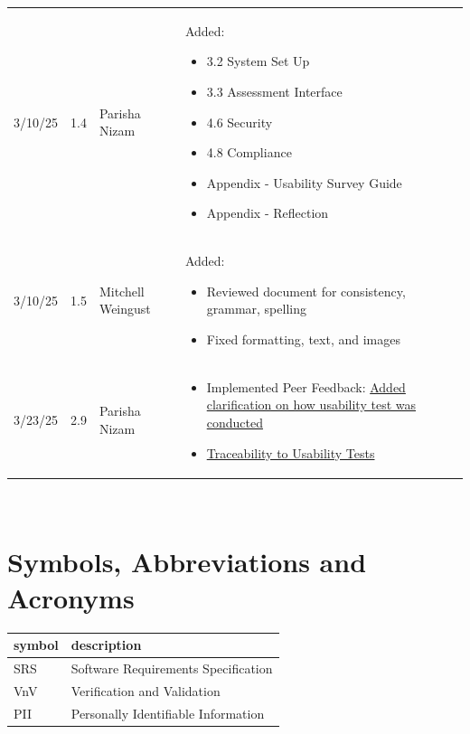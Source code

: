 \documentclass[12pt, titlepage]{article}
\begin{document}
\begin{table}[hp]
\begin{tabularx}{\textwidth}{p{1.5cm}p{1cm}p{3.5cm}X}
  3/10/25 & 1.4 & Parisha Nizam & Added:\begin{itemize}[leftmargin=*]
    \item 3.2 System Set Up
    \item 3.3 Assessment Interface
    \item 4.6 Security
    \item 4.8 Compliance 
    \item Appendix - Usability Survey Guide
    \item Appendix - Reflection
  \end{itemize}\\
  3/10/25 & 1.5 & Mitchell Weingust & Added:\begin{itemize}[leftmargin=*]
    \item Reviewed document for consistency, grammar, spelling
    \item Fixed formatting, text, and images
  \end{itemize}\\
  3/23/25 & 2.9 & Parisha Nizam & \begin{itemize}[leftmargin=*]
    \item Implemented Peer Feedback: \href{https://github.com/parishanizam/TeleHealth/issues/535}{Added clarification on how usability test was conducted}
    \item \href{https://github.com/parishanizam/TeleHealth/issues/537}{Traceability to Usability Tests}
  \end{itemize}\\

  \bottomrule
  \end{tabularx}
  \end{table}

~\newpage

\section{Symbols, Abbreviations and Acronyms}

\renewcommand{\arraystretch}{1.2}
\begin{tabular}{l l} 
  \toprule		
  \textbf{symbol} & \textbf{description}\\
  \midrule 
  SRS & Software Requirements Specification\\
  VnV & Verification and Validation\\
  PII & Personally Identifiable Information\\
  \bottomrule
\end{tabular}\\
\end{document}

